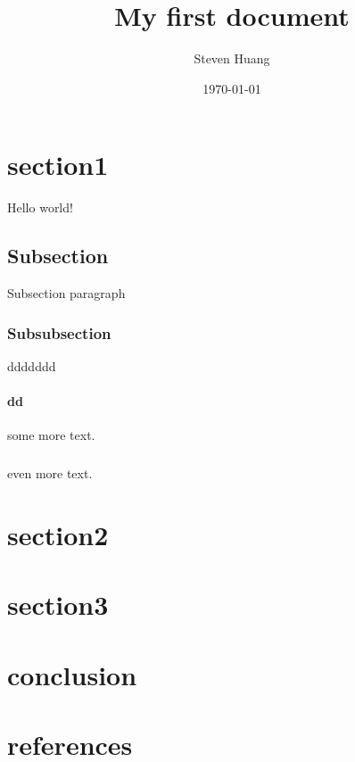 \documentclass{article}
\title{ My first document}
\date{\today}
\author{Steven Huang}
\begin{document}
\maketitle
\newpage
{}

\section{section1}
Hello world!

\subsection{Subsection}
Subsection paragraph

\subsubsection{Subsubsection}
ddddddd

\paragraph{dd}
some more text.
\subparagraph{}
even more text.

\section{section2}
\section{section3}
\section{conclusion}
\section{references}
\end{document}
